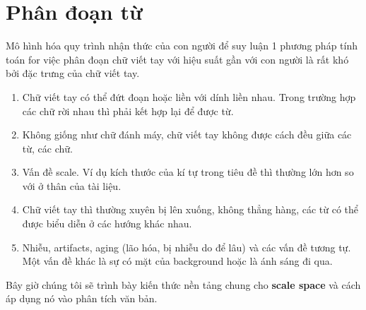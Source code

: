 \documentclass[a4paper]{article}
\begin{document}
\section{Phân đoạn từ}
Mô hình hóa quy trình nhận thức của con người để suy luận 1 phương pháp tính toán for việc phân đoạn chữ viết tay với hiệu suất gần với con người là rất khó bởi đặc trưng của chữ viết tay.

\begin{enumerate}
    \item Chữ viết tay có thể đứt đoạn hoặc liền với dính liền nhau. Trong trường hợp các chữ rời nhau thì phải kết hợp lại để được từ.
    \item Không giống như chữ đánh máy, chữ viết tay không được cách đều giữa các từ, các chữ.
    \item Vấn đề scale. Ví dụ kích thước của kí tự trong tiêu đề thì thường lớn hơn so với ở thân của tài liệu.
    \item Chữ viết tay thì thường xuyên bị lên xuống, không thẳng hàng, các từ có thể được biểu diễn ở các hướng khác nhau.
    \item Nhiễu, artifacts, aging (lão hóa, bị nhiễu do để lâu) và các vấn đề tương tự. Một vấn đề khác là sự có mặt của background hoặc là ánh sáng đi qua.
\end{enumerate}

Bây giờ chúng tôi sẽ trình bày kiến thức nền tảng chung cho \textbf{scale space} và cách áp dụng nó vào phân tích văn bản.
\end{document}
